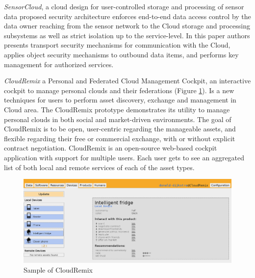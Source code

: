 	\emph{SensorCloud}\cite{hummen2012cloud}, a cloud design for user-controlled storage and processing of sensor data proposed security architecture enforces end-to-end data access control by the data owner reaching from the sensor network to the Cloud storage and processing subsystems as well as strict isolation up to the service-level. In this paper authors presents transport security mechanisms for communication with the Cloud, applies object security mechanisms to outbound data items, and performs key management for authorized services. 

	\emph{CloudRemix\cite{spillner2013personal}} a Personal and Federated Cloud Management Cockpit, an interactive cockpit to manage personal clouds and their federations (Figure \ref{img:cockpit}). Is a new techniques for users to perform asset discovery, exchange and management in Cloud area. The CloudRemix prototype demonstrates its utility to manage personal clouds in both social and market-driven environments. The goal of CloudRemix is to be open, user-centric regarding the manageable assets, and flexible regarding their free or commercial exchange, with or without explicit contract negotiation. CloudRemix is an open-source web-based cockpit application with support for multiple users. Each user gets to see an aggregated list of both local and remote services of each of the asset types.
	    \begin{figure}[!ht]
		\centering
		\includegraphics[scale=0.6]{Material/examples/CloudRemix.png}   
		\caption[Sample of CloudRemix]{Sample of CloudRemix}   
		\label{img:cockpit}               
		\end{figure}
  
